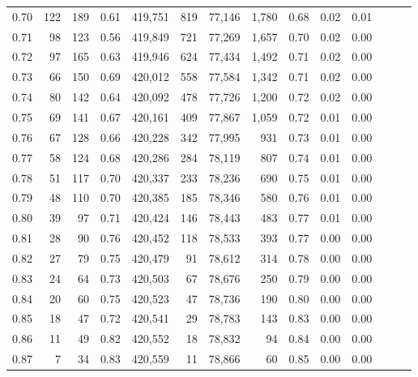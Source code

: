 \begin{tabular}{rrrrrrrrrrrrrr}
0.70 &     122 &    189 &  0.61 &  419,751 &      819 &  77,146 &   1,780 &  0.68 &  0.02 &      0.01 \\
0.71 &      98 &    123 &  0.56 &  419,849 &      721 &  77,269 &   1,657 &  0.70 &  0.02 &      0.00 \\
0.72 &      97 &    165 &  0.63 &  419,946 &      624 &  77,434 &   1,492 &  0.71 &  0.02 &      0.00 \\
0.73 &      66 &    150 &  0.69 &  420,012 &      558 &  77,584 &   1,342 &  0.71 &  0.02 &      0.00 \\
0.74 &      80 &    142 &  0.64 &  420,092 &      478 &  77,726 &   1,200 &  0.72 &  0.02 &      0.00 \\
0.75 &      69 &    141 &  0.67 &  420,161 &      409 &  77,867 &   1,059 &  0.72 &  0.01 &      0.00 \\
0.76 &      67 &    128 &  0.66 &  420,228 &      342 &  77,995 &     931 &  0.73 &  0.01 &      0.00 \\
0.77 &      58 &    124 &  0.68 &  420,286 &      284 &  78,119 &     807 &  0.74 &  0.01 &      0.00 \\
0.78 &      51 &    117 &  0.70 &  420,337 &      233 &  78,236 &     690 &  0.75 &  0.01 &      0.00 \\
0.79 &      48 &    110 &  0.70 &  420,385 &      185 &  78,346 &     580 &  0.76 &  0.01 &      0.00 \\
0.80 &      39 &     97 &  0.71 &  420,424 &      146 &  78,443 &     483 &  0.77 &  0.01 &      0.00 \\
0.81 &      28 &     90 &  0.76 &  420,452 &      118 &  78,533 &     393 &  0.77 &  0.00 &      0.00 \\
0.82 &      27 &     79 &  0.75 &  420,479 &       91 &  78,612 &     314 &  0.78 &  0.00 &      0.00 \\
0.83 &      24 &     64 &  0.73 &  420,503 &       67 &  78,676 &     250 &  0.79 &  0.00 &      0.00 \\
0.84 &      20 &     60 &  0.75 &  420,523 &       47 &  78,736 &     190 &  0.80 &  0.00 &      0.00 \\
0.85 &      18 &     47 &  0.72 &  420,541 &       29 &  78,783 &     143 &  0.83 &  0.00 &      0.00 \\
0.86 &      11 &     49 &  0.82 &  420,552 &       18 &  78,832 &      94 &  0.84 &  0.00 &      0.00 \\
0.87 &       7 &     34 &  0.83 &  420,559 &       11 &  78,866 &      60 &  0.85 &  0.00 &      0.00 \\

\end{tabular}
